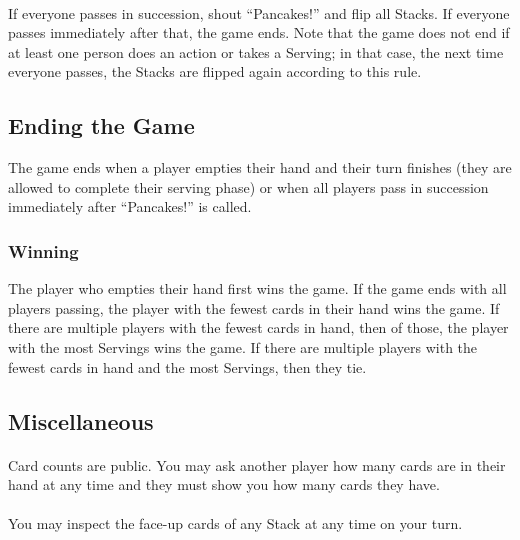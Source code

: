 \documentclass{article}
\begin{document}
\paragraph{\label{par:pancakeflip}}
If everyone passes in succession, shout ``Pancakes!'' and flip all Stacks. If everyone passes immediately after that, the game ends. Note that the game does not end if at least one person does an action or takes a Serving; in that case, the next time everyone passes, the Stacks are flipped again according to this rule.

\subsection{Ending the Game \label{sec:endgame}}

The game ends when a player empties their hand and their turn finishes (they are allowed to complete their serving phase) or when all players pass in succession immediately after ``Pancakes!'' is called.

\subsubsection{Winning \label{sec:winning}}

The player who empties their hand first wins the game. If the game ends with all players passing, the player with the fewest cards in their hand wins the game.
If there are multiple players with the fewest cards in hand, then of those, the player with the most Servings wins the game.
If there are multiple players with the fewest cards in hand and the most Servings, then they tie.

\subsection{Miscellaneous \label{sec:misc}}

\paragraph{\label{par:cardcount}}
Card counts are public. You may ask another player how many cards are in their hand at any time and they must show you how many cards they have.

\paragraph{\label{par:inspect}}
You may inspect the face-up cards of any Stack at any time on your turn.
\end{document}
